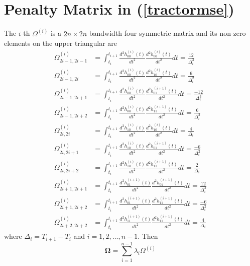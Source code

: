 


\section{Penalty Matrix in (\ref{tractormse})}\label{PenaltyTermDetails}

The $i$-th $\Omega^{(i)}$ is a $2n \times 2n$ bandwidth four symmetric matrix and its non-zero elements on the upper triangular are 
\begin{align}
\Omega_{2i-1,2i-1}^{(i)} & =\int_{t_{i}}^{t_{i+1}} \frac{d^2 h_{00}^{(i)}(t)}{dt^2}  \frac{d^2 h_{00}^{(i)}(t)}{dt^2} dt=\frac{12}{\Delta_i^3}\\
\Omega_{2i-1,2i}^{(i)} &=\int_{t_{i}}^{t_{i+1}} \frac{d^2 h_{00}^{(i)}(t)}{dt^2}  \frac{d^2 h_{10}^{(i)}(t)}{dt^2} dt=\frac{6}{\Delta_i^2}\\
\Omega_{2i-1,2i+1}^{(i)} &=\int_{t_{i}}^{t_{i+1}} \frac{d^2 h_{00}^{(i)}(t)}{dt^2}  \frac{d^2 h_{01}^{(i+1)}(t)}{dt^2} dt=\frac{-12}{\Delta_i^3}\\
\Omega_{2i-1,2i+2}^{(i)} &=\int_{t_{i}}^{t_{i+1}} \frac{d^2 h_{00}^{(i)}(t)}{dt^2}  \frac{d^2 h_{11}^{(i+1)}(t)}{dt^2} dt=\frac{6}{\Delta_i^2}\\
\Omega_{2i,2i}^{(i)} &=\int_{t_{i}}^{t_{i+1}} \frac{d^2 h_{10}^{(i)}(t)}{dt^2}  \frac{d^2 h_{10}^{(i)}(t)}{dt^2} dt=\frac{4}{\Delta_i} \\
\Omega_{2i,2i+1}^{(i)} &=\int_{t_{i}}^{t_{i+1}} \frac{d^2 h_{10}^{(i)}(t)}{dt^2}  \frac{d^2 h_{01}^{(i+1)}(t)}{dt^2} dt=\frac{-6}{\Delta_i^2}\\
\Omega_{2i,2i+2}^{(i)} &=\int_{t_{i}}^{t_{i+1}} \frac{d^2 h_{10}^{(i)}(t)}{dt^2}  \frac{d^2 h_{11}^{(i+1)}(t)}{dt^2} dt=\frac{2}{\Delta_i}\\
\Omega_{2i+1,2i+1}^{(i)} &=\int_{t_{i}}^{t_{i+1}} \frac{d^2 h_{01}^{(i+1)}(t)}{dt^2}  \frac{d^2 h_{01}^{(i+1)}(t)}{dt^2} dt=\frac{12}{\Delta_i^3}\\
\Omega_{2i+1,2i+2}^{(i)} &=\int_{t_{i}}^{t_{i+1}} \frac{d^2 h_{01}^{(i+1)}(t)}{dt^2}  \frac{d^2 h_{11}^{(i+1)}(t)}{dt^2} dt=\frac{-6}{\Delta_i^2}\\
\Omega_{2i+2,2i+2}^{(i)} &=\int_{t_{i}}^{t_{i+1}} \frac{d^2 h_{11}^{(i+1)}(t)}{dt^2}  \frac{d^2 h_{11}^{(i+1)}(t)}{dt^2} dt=\frac{4}{\Delta_i}
\end{align}
where $\Delta_i=T_{i+1}-T_i$ and $i=1,2,\ldots,n-1$. Then 
\begin{equation*}
\mathbf{\Omega}=\sum_{i=1}^{n-1}\lambda_i\Omega^{(i)}
\end{equation*}


